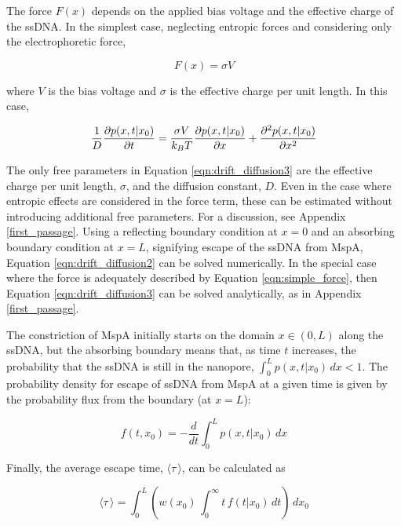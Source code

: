 The force $F(x)$ depends on the applied bias voltage and the effective charge of the ssDNA.  In the simplest case, neglecting entropic forces and considering only the electrophoretic force,

\begin{equation}
F(x) = \sigma V
\label{eqn:simple_force}
\end{equation}

\noindent
where $V$ is the bias voltage and $\sigma$ is the effective charge per unit length.  In this case,

\begin{equation}
\frac{1}{D} \frac{\partial p(x,t|x_0)}{\partial t} = \frac{\sigma V}{k_B T} \frac{\partial p(x,t|x_0)}{\partial x} + \frac{\partial^2 p(x,t|x_0)}{\partial x^2}
\label{eqn:drift_diffusion3}
\end{equation}

The only free parameters in Equation \ref{eqn:drift_diffusion3} are the effective charge per unit length, $\sigma$, and the diffusion constant, $D$.  Even in the case where entropic effects are considered in the force term, these can be estimated without introducing additional free parameters.  For a discussion, see Appendix \ref{first_passage}.  Using a reflecting boundary condition at $x=0$ and an absorbing boundary condition at $x=L$, signifying escape of the ssDNA from MspA, Equation \ref{eqn:drift_diffusion2} can be solved numerically.  In the special case where the force is adequately described by Equation \ref{eqn:simple_force}, then Equation \ref{eqn:drift_diffusion3} can be solved analytically, as in Appendix \ref{first_passage}.

The constriction of MspA initially starts on the domain $x \in (0,L)$ along the ssDNA, but the absorbing boundary means that, as time $t$ increases, the probability that the ssDNA is still in the nanopore, $\int_0^L p(x,t|x_0) \, dx < 1$.  The probability density for escape of ssDNA from MspA at a given time is given by the probability flux from the boundary (at $x=L$):

\begin{equation}
f(t,x_0) = -\frac{d}{dt} \int_0^L p(x,t|x_0) \, dx
\label{eqn:escape_time_dist}
\end{equation}

Finally, the average escape time, $\langle \tau \, \rangle$, can be calculated as

\begin{equation}
\langle \tau \, \rangle = \int_0^L \left( w(x_0) \, \int_0^{\infty} t \, f(t|x_0) \, dt \right) \, dx_0
\label{eqn:mean_escape_time}
\end{equation}

